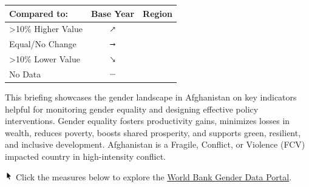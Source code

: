 \documentclass[
]{article}
\author{}
\date{\vspace{-2.5em}}
\begin{document}

\begin{table}\begingroup\fontsize{8}{10}\selectfont

\begin{tabular}[t]{lcl}

\textbf{Compared to:} & \textbf{Base Year} & \textbf{Region}\\
\midrule
>10\% Higher Value & \includegraphics[width=0.1in, height=0.1in]{upicon.png} & \cellcolor[HTML]{21908C}{}\\
Equal/No Change & \includegraphics[width=0.1in, height=0.1in]{righticon.png} & \cellcolor[HTML]{34608D}{}\\
>10\% Lower Value & \includegraphics[width=0.1in, height=0.1in]{downicon.png} & \cellcolor[HTML]{482576}{}\\
No Data & \includegraphics[width=0.1in, height=0.1in]{naicon.png} & \cellcolor{gray}{}\\

\end{tabular}
\endgroup{}\end{table}

\begin{minipage}[t][1.7cm][t]{12cm}
\fontsize{9}{8}\selectfont\raggedright
This briefing showcases the gender landscape in Afghanistan on key indicators helpful for monitoring gender equality and designing effective policy interventions. Gender equality fosters productivity gains, minimizes losses in wealth, reduces poverty, boosts shared prosperity, and supports green, resilient, and inclusive development. Afghanistan is a Fragile, Conflict, or Violence (FCV) impacted country in high-intensity conflict. 

\includegraphics[width=10pt]{pointer.png} Click the measures below to explore the \underline{\href{https://genderdata.worldbank.org/}{World Bank Gender Data Portal}}.
\end{minipage}
\vspace{6pt}
\vspace{16pt}
\end{document}
